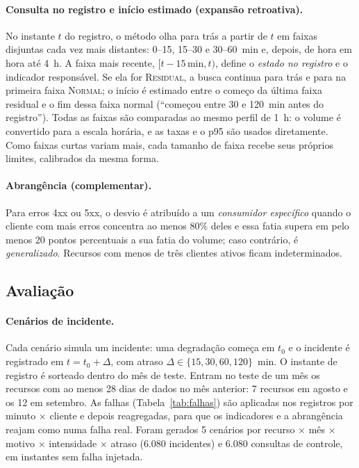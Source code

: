 \documentclass[sigconf,nonacm]{acmart}
\newcommand{\Normal}{\textsc{Normal}\xspace}
\newcommand{\Residual}{\textsc{Residual}\xspace}
\begin{document}
\paragraph{Consulta no registro e início estimado (expansão retroativa).} No instante $t$ do registro, o método olha para trás a partir de $t$ em faixas disjuntas cada vez mais distantes: 0--15, 15--30 e 30--60~min e, depois, de hora em hora até 4~h. A faixa mais recente, $[t-15\,\text{min}, t)$, define o \emph{estado no registro} e o indicador responsável. Se ela for \Residual, a busca continua para trás e para na primeira faixa \Normal; o início é estimado entre o começo da última faixa residual e o fim dessa faixa normal (``começou entre 30 e 120~min antes do registro''). Todas as faixas são comparadas ao mesmo perfil de 1~h: o volume é convertido para a escala horária, e as taxas e o p95 são usados diretamente. Como faixas curtas variam mais, cada tamanho de faixa recebe seus próprios limites, calibrados da mesma forma.

\paragraph{Abrangência (complementar).} Para erros 4xx ou 5xx, o desvio é atribuído a um \emph{consumidor específico} quando o cliente com mais erros concentra ao menos 80\% deles e essa fatia supera em pelo menos 20 pontos percentuais a sua fatia do volume; caso contrário, é \emph{generalizado}. Recursos com menos de três clientes ativos ficam indeterminados.

\subsection{Avaliação}

\paragraph{Cenários de incidente.} Cada cenário simula um incidente: uma degradação começa em $t_0$ e o incidente é registrado em $t=t_0+\Delta$, com atraso $\Delta\in\{15,30,60,120\}$~min. O instante de registro é sorteado dentro do mês de teste. Entram no teste de um mês os recursos com ao menos 28 dias de dados no mês anterior: 7 recursos em agosto e os 12 em setembro. As falhas (Tabela~\ref{tab:falhas}) são aplicadas nos registros por minuto $\times$ cliente e depois reagregadas, para que os indicadores e a abrangência reajam como numa falha real. Foram gerados 5 cenários por recurso $\times$ mês $\times$ motivo $\times$ intensidade $\times$ atraso (6.080 incidentes) e 6.080 consultas de controle, em instantes sem falha injetada. 
\end{document}

